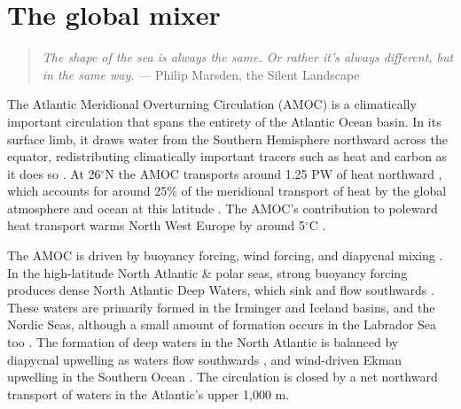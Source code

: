 \chapter{The global mixer}
\label{chap:1}

\begin{quote}
\textit{The shape of the sea is always the same. Or rather it's always different, but in the same way.} --- Philip Marsden, the Silent Landscape
\end{quote}

The Atlantic Meridional Overturning Circulation (AMOC) is a climatically important circulation that spans the entirety of the Atlantic Ocean basin. In its surface limb, it draws water from the Southern Hemisphere northward across the equator, redistributing climatically important tracers such as heat and carbon as it does so \citep{Buckley2015}. At 26$^\circ$N the AMOC transports around 1.25 PW of heat northward \citep{Bryden2020}, which accounts for around 25\% of the meridional transport of heat by the global atmosphere and ocean at this latitude \citep{Srokosz2012}. The AMOC's contribution to poleward heat transport warms North West Europe by around 5$^\circ$C \citep{Jackson2015}.

The AMOC is driven by buoyancy forcing, wind forcing, and diapycnal mixing \citep[e.g.][]{Munk1998, Johnson2019}.
In the high-latitude North Atlantic \& polar seas, strong buoyancy forcing produces dense North Atlantic Deep Waters, which sink and flow southwards \citep[e.g.][]{Marshall1999}. These waters are primarily formed in the Irminger and Iceland basins, and the Nordic Seas, although a small amount of formation occurs in the Labrador Sea too \citep{Lozier2019}. The formation of deep waters in the North Atlantic is balanced by diapycnal upwelling as waters flow southwards \citep{Munk1966, Ferrari2016, Mashayek2017, McDougall2017, Callies2018, Cimoli2022}, and wind-driven Ekman upwelling in the Southern Ocean \citep{Gnanadesikan1999, Marshall2012}. The circulation is closed by a net northward transport of waters in the Atlantic's upper 1,000 m.


